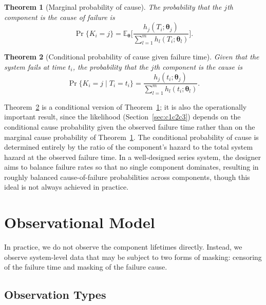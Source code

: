 \documentclass[11pt]{article}
\theoremstyle{definition}
\theoremstyle{plain}
\newtheorem{theorem}{Theorem}
\renewcommand{\v}[1]{\boldsymbol{#1}}
\newcommand{\btheta}{\v{\theta}}
\newcommand{\E}{\mathbb{E}}
\begin{document}
\begin{theorem}[Marginal probability of cause]
\label{thm:prob-k}
The probability that the $j$th component is the cause of failure is
\begin{equation}
\label{eq:prob-k}
    \Pr\{K_i = j\} = \E_{\btheta}\!\biggl[
        \frac{h_j(T_i; \v{\theta}_j)}
             {\sum_{l=1}^m h_l(T_i; \v{\theta}_l)}
    \biggr].
\end{equation}
\end{theorem}

\begin{theorem}[Conditional probability of cause given failure time]
\label{thm:prob-k-given-t}
Given that the system fails at time $t_i$, the probability that the
$j$th component is the cause is
\begin{equation}
\label{eq:prob-k-given-t}
    \Pr\{K_i = j \mid T_i = t_i\}
    = \frac{h_j(t_i; \v{\theta}_j)}
           {\sum_{l=1}^m h_l(t_i; \v{\theta}_l)}.
\end{equation}
\end{theorem}

Theorem~\ref{thm:prob-k-given-t} is a conditional version of
Theorem~\ref{thm:prob-k}; it is also the operationally important
result, since the likelihood (Section~\ref{sec:c1c2c3}) depends on
the conditional cause probability given the observed failure time
rather than on the marginal cause probability of
Theorem~\ref{thm:prob-k}.
The conditional probability of cause is determined entirely by the
ratio of the component's hazard to the total system hazard at the
observed failure time.
In a well-designed series system, the designer aims to balance failure
rates so that no single component dominates, resulting in roughly
balanced cause-of-failure probabilities across components, though this
ideal is not always achieved in practice.


\section{Observational Model}
\label{sec:observational-model}

In practice, we do not observe the component lifetimes directly.
Instead, we observe system-level data that may be subject to two forms
of masking: censoring of the failure time and masking of the failure
cause.

\subsection{Observation Types}
\label{sec:observation-types}
\end{document}
